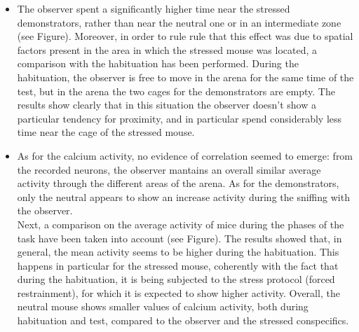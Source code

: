 \documentclass[a4paper]{article}
\begin{document}
\begin{itemize}
	\item The observer spent a significantly higher time near the stressed demonstrators, rather than near the neutral one or in an intermediate zone (see Figure). Moreover, in order to rule rule that this effect was due to spatial factors present in the area in which the stressed mouse was located, a comparison with the habituation has been performed. During the habituation, the observer is free to move in the arena for the same time of the test, but in the arena the two cages for the demonstrators are empty. The results show clearly that in this situation the observer doesn't show a particular tendency for proximity, and in particular spend considerably less time near the cage of the stressed mouse.
	
	\item As for the calcium activity, no evidence of correlation seemed to emerge: from the recorded neurons, the observer mantains an overall similar average activity through the different areas of the arena. As for the demonstrators, only the neutral appears to show an increase activity during the sniffing with the observer.
	\\
	
	Next, a comparison on the average activity of mice during the phases of the task have been taken into account (see Figure). The results showed that, in general, the mean activity seems to be higher during the habituation. This happens in particular for the stressed mouse, coherently with the fact that during the habituation, it is being subjected to the stress protocol (forced restrainment), for which it is expected to show higher activity. Overall, the neutral mouse shows smaller values of calcium activity, both during habituation and test, compared to the observer and the stressed conspecifics.
	
\end{itemize}
	
\end{document}
